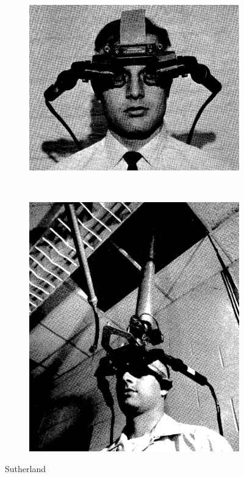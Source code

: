 \documentclass[a4]{scrartcl}
\begin{document}
\begin{figure}[!h]
	\centering
	\begin{subfigure}{.4\textwidth}
	  \centering
	  \includegraphics[width=\linewidth]{sutherland-1}
	\end{subfigure}
	~
	\begin{subfigure}{.4\textwidth}
	  \centering
	  \includegraphics[width=0.8\linewidth]{sutherland-2}
	\end{subfigure}
 	\caption{Sutherland \cite{Sutherland68}}
\end{figure}
\end{document}
